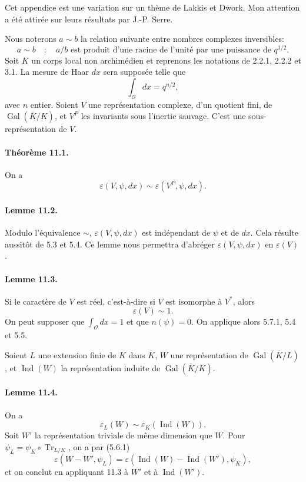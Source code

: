 \documentclass[10pt]{article}
\newcommand{\Gal}{\operatorname{Gal}}
\newcommand{\Ind}{\operatorname{Ind}}
\newcommand{\Tr}{\operatorname{Tr}}
\providecommand{\OO}{\mathcal O}
\providecommand{\OO}{\mathcal O}
\providecommand{\OO}{\mathcal O}
\providecommand{\OO}{\mathcal O}
\providecommand{\Gal}{\operatorname{Gal}}
\providecommand{\OO}{\mathcal O}
\providecommand{\Gal}{\operatorname{Gal}}
\providecommand{\Tr}{\operatorname{Tr}}
\providecommand{\OO}{\mathcal O}
\providecommand{\Gal}{\operatorname{Gal}}
\providecommand{\Tr}{\operatorname{Tr}}
\providecommand{\OO}{\mathcal O}
\providecommand{\Gal}{\operatorname{Gal}}
\providecommand{\Tr}{\operatorname{Tr}}
\providecommand{\Ind}{\operatorname{Ind}}
\begin{document}
Cet appendice est une variation sur un thème de Lakkis et Dwork. Mon attention a été attirée sur leurs résultats par J.-P. Serre.

Nous noterons \(a\sim b\) la relation suivante entre nombres complexes inversibles:
\[
a\sim b\quad:\quad a/b\text{ est produit d'une racine de l'unité par une puissance de }q^{1/2}.
\]
Soit \(K\) un corps local non archimédien et reprenons les notations de 2.2.1, 2.2.2 et 3.1. La mesure de Haar \(dx\) sera supposée telle que
\[
\int_{\OO}dx=q^{n/2},
\]
avec \(n\) entier. Soient \(V\) une représentation complexe, d'un quotient fini, de \(\Gal(\overline K/K)\), et \(V^P\) les invariants sous l'inertie sauvage. C'est une sous-représentation de \(V\).

\paragraph{Théorème 11.1.} On a
\[
\varepsilon(V,\psi,dx)\sim\varepsilon(V^P,\psi,dx).
\]

\paragraph{Lemme 11.2.} Modulo l'équivalence \(\sim\), \(\varepsilon(V,\psi,dx)\) est indépendant de \(\psi\) et de \(dx\). Cela résulte aussitôt de 5.3 et 5.4. Ce lemme nous permettra d'abréger \(\varepsilon(V,\psi,dx)\) en \(\varepsilon(V)\).

\paragraph{Lemme 11.3.} Si le caractère de \(V\) est réel, c'est-à-dire si \(V\) est isomorphe à \(V^*\), alors
\[
\varepsilon(V)\sim1.
\]
On peut supposer que \(\int_{\OO}dx=1\) et que \(n(\psi)=0\). On applique alors 5.7.1, 5.4 et 5.5.

Soient \(L\) une extension finie de \(K\) dans \(\overline K\), \(W\) une représentation de \(\Gal(\overline K/L)\), et \(\Ind(W)\) la représentation induite de \(\Gal(\overline K/K)\).

\paragraph{Lemme 11.4.} On a
\[
\varepsilon_L(W)\sim\varepsilon_K(\Ind(W)).
\]
Soit \(W'\) la représentation triviale de même dimension que \(W\). Pour \(\psi_L=\psi_K\circ\Tr_{L/K}\), on a par (5.6.1)
\[
\varepsilon(W-W',\psi_L)=\varepsilon(\Ind(W)-\Ind(W'),\psi_K),
\]
et on conclut en appliquant 11.3 à \(W'\) et à \(\Ind(W')\).
\end{document}

